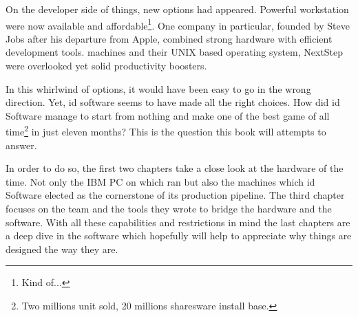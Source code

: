  On the developer side of things, new options had appeared. Powerful workstation were now available and affordable\footnote{Kind of...}. One company in particular, founded by Steve Jobs after his departure from Apple, combined strong hardware with efficient development tools. \NeXT machines and their UNIX based operating system, NextStep were overlooked yet solid productivity boosters.\\
 \par
 In this whirlwind of options, it would have been easy to go in the wrong direction. Yet, id software seems to have made all the right choices. How did id Software manage to start from nothing and make one of the best game of all time\footnote{Two millions unit sold, 20 millions sharesware install base.} in just eleven months? This is the question this book will attempts to answer.\\
 \par
  In order to do so, the first two chapters take a close look at the hardware of the time. Not only the IBM PC on which \doom ran but also the \NeXT machines which id Software elected as the cornerstone of its production pipeline. The third chapter focuses on the team and the tools they wrote to bridge the hardware and the software. With all these capabilities and restrictions in mind the last chapters are a deep dive in the software which hopefully will help to appreciate why things are designed the way they are.\\

\begin{figure}[H]
\centering
{}
\end{figure}
\par
\vspace{15pt}
\par
\begin{figure}[H]
\centering
{}
\end{figure}
